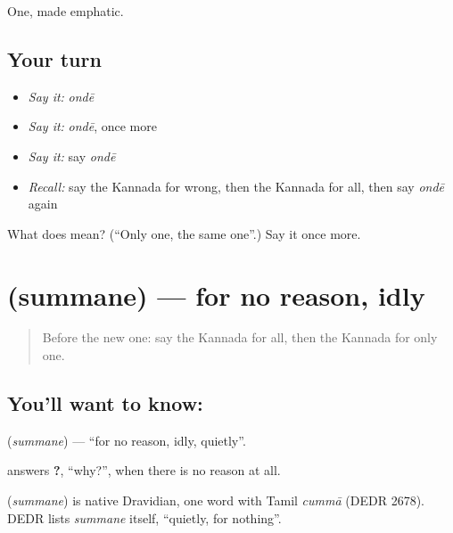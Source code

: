 \begin{grammarlens}[title={What you've built}]
One, made emphatic.
\end{grammarlens}

\subsection*{Your turn}
\begin{itemize}
\raggedright
  \item \emph{Say it:} \emph{ondē}
  \item \emph{Say it:} \emph{ondē}, once more
  \item \emph{Say it:} say \emph{ondē}
  \item \emph{Recall:} say the Kannada for wrong, then the Kannada for all, then say \emph{ondē} again
\end{itemize}

\begin{tcolorbox}[breakable,colback=teal!4,colframe=teal!35!black,title={Before you move on}]
What does  mean? (\textquotedblleft{}Only one, the same one\textquotedblright{}.) Say it once more.
\end{tcolorbox}
\section[\texorpdfstring{\kn{ಸುಮ್ಮನೆ} (summane)}{ಸುಮ್ಮನೆ (summane)}]{ (summane) — for no reason, idly}

\label{lesson:KA-C102-fornoreason}



\begin{quote}
Before the new one: say the Kannada for all, then the Kannada for only one.
\end{quote}

\subsection*{You'll want to know: }
\textbf{} (\emph{summane}) — \textquotedblleft{}for no reason, idly, quietly\textquotedblright{}.

\textbf{} answers \textbf{?}, \textquotedblleft{}why?\textquotedblright{}, when there is no reason at all.

\begin{cousinweb}
\textbf{} (\emph{summane}) is native Dravidian, one word with Tamil \emph{cummā} (DEDR 2678). DEDR lists \emph{summane} itself, \textquotedblleft{}quietly, for nothing\textquotedblright{}.
\end{cousinweb}

